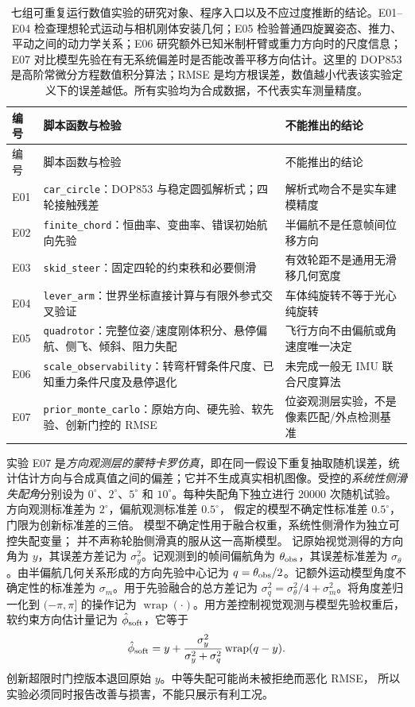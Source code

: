 \documentclass[UTF8,a4paper,fontset=fandol,11pt]{ctexart}
\begin{document}
\begin{longtable}{p{.10\linewidth}p{.37\linewidth}p{.40\linewidth}}
\caption{七组可重复运行数值实验的研究对象、程序入口以及不应过度推断的结论。E01--E04 检查理想轮式运动与相机刚体安装几何；E05 检验普通四旋翼姿态、推力、平动之间的动力学关系；E06 研究额外已知米制杆臂或重力方向时的尺度信息；E07 对比模型先验在有无系统偏差时是否能改善平移方向估计。这里的 DOP853 是高阶常微分方程数值积分算法；RMSE 是均方根误差，数值越小代表该实验定义下的误差越低。所有实验均为合成数据，不代表实车测量精度。}\label{tab:experiments}\\
\toprule
编号 & 脚本函数与检验 & 不能推出的结论 \\
\midrule\endfirsthead
\toprule 编号 & 脚本函数与检验 & 不能推出的结论 \\
\midrule\endhead
E01 & \texttt{car\_circle}：DOP853 与稳定圆弧解析式；四轮接触残差 & 解析式吻合不是实车建模精度 \\
E02 & \texttt{finite\_chord}：恒曲率、变曲率、错误初始航向先验 & 半偏航不是任意帧间位移方向 \\
E03 & \texttt{skid\_steer}：固定四轮的约束秩和必要侧滑 & 有效轮距不是通用无滑移几何宽度 \\
E04 & \texttt{lever\_arm}：世界坐标直接计算与有限外参式交叉验证 & 车体纯旋转不等于光心纯旋转 \\
E05 & \texttt{quadrotor}：完整位姿/速度刚体积分、悬停偏航、侧飞、倾斜、阻力失配 & 飞行方向不由偏航或角速度唯一决定 \\
E06 & \texttt{scale\_observability}：转弯杆臂条件尺度、已知重力条件尺度及悬停退化 & 未完成一般无 IMU 联合尺度算法 \\
E07 & \texttt{prior\_monte\_carlo}：原始方向、硬先验、软先验、创新门控的 RMSE & 位姿观测层实验，不是像素匹配/外点检测基准 \\
\bottomrule
\end{longtable}

实验 E07 是\emph{方向观测层的蒙特卡罗仿真}，即在同一假设下重复抽取随机误差，统计估计方向与合成真值之间的偏差；它并不生成真实相机图像。受控的\emph{系统性侧滑失配角}分别设为 $0^\circ$、$2^\circ$、$5^\circ$ 和 $10^\circ$。每种失配角下独立进行 $20000$ 次随机试验。
方向观测标准差为 $2^\circ$，偏航观测标准差 $0.5^\circ$，
假定的模型不确定性标准差 $0.5^\circ$，门限为创新标准差的三倍。
模型不确定性用于融合权重，系统性侧滑作为独立可控失配变量；
并不声称轮胎侧滑真的服从这一高斯模型。
记原始视觉测得的方向角为 $y$，其误差方差记为 $\sigma_y^2$。记观测到的帧间偏航角为 $\theta_{\rm obs}$，其误差标准差为 $\sigma_\theta$。由半偏航几何关系形成的方向先验中心记为 $q=\theta_{\rm obs}/2$。记额外运动模型角度不确定性的标准差为 $\sigma_m$。用于先验融合的总方差记为 $\sigma_q^2=\sigma_\theta^2/4+\sigma_m^2$。将角度差归一化到 $(-\pi,\pi]$ 的操作记为 $\operatorname{wrap}(\cdot)$。用方差控制视觉观测与模型先验权重后，软约束方向估计量记为 $\hat\phi_{\rm soft}$，它等于
\begin{equation}
 \hat\phi_{\rm soft}=y+
 \frac{\sigma_y^2}{\sigma_y^2+\sigma_q^2}\operatorname{wrap}(q-y).
\end{equation}
创新超限时门控版本退回原始 $y$。中等失配可能尚未被拒绝而恶化 RMSE，
所以实验必须同时报告改善与损害，不能只展示有利工况。
\end{document}
